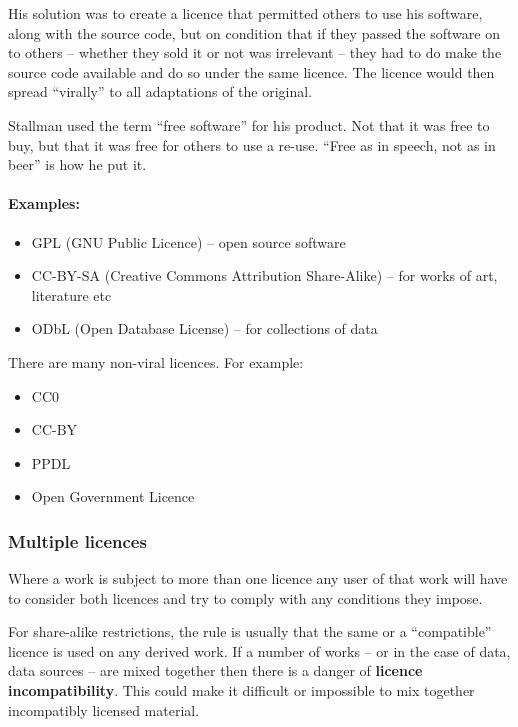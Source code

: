 His solution was to create a licence that permitted others to use his
software, along with the source code, but on condition that if they
passed the software on to others -- whether they sold it or not was
irrelevant -- they had to do make the source code available and do so
under the same licence. The licence would then spread ``virally'' to all
adaptations of the original.

Stallman used the term ``free software'' for his product. Not that it
was free to buy, but that it was free for others to use a re-use. ``Free
as in speech, not as in beer'' is how he put it.

\paragraph{Examples:}\label{examples}

\begin{itemize}
\item
  GPL (GNU Public Licence) -- open source software
\item
  CC-BY-SA (Creative Commons Attribution Share-Alike) -- for works of
  art, literature etc
\item
  ODbL (Open Database License) -- for collections of data
\end{itemize}

There are many non-viral licences. For example:

\begin{itemize}
\item
  CC0
\item
  CC-BY
\item
  PPDL
\item
  Open Government Licence
\end{itemize}

\subsubsection{Multiple licences}\label{multiple-licences}

Where a work is subject to more than one licence any user of that work
will have to consider both licences and try to comply with any
conditions they impose.

For share-alike restrictions, the rule is usually that the same or a
``compatible'' licence is used on any derived work. If a number of works
-- or in the case of data, data sources -- are mixed together then there
is a danger of \textbf{licence incompatibility}. This could make it
difficult or impossible to mix together incompatibly licensed material.

